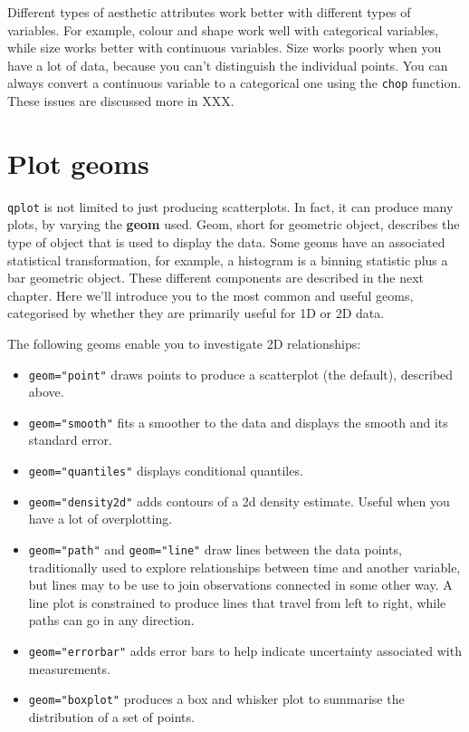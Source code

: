 Different types of aesthetic attributes work better with different types of variables.  For example, colour and shape work well with categorical variables, while size works better with continuous variables.  Size works poorly when you have a lot of data, because you can't distinguish the individual points.  You can always convert a continuous variable to a categorical one using the {\tt chop} function.  These issues are discussed more in XXX.

\section{Plot geoms}\label{sec:plot_geoms}

{\tt qplot} is not limited to just producing scatterplots.  In fact, it can produce many plots, by varying the {\bf geom} used. Geom, short for geometric object, describes the type of object that is used to display the data.  Some geoms have an associated statistical transformation, for example, a histogram is a binning statistic plus a bar geometric object.  These different components are described in the next chapter.  Here we'll introduce you to the most common and useful geoms, categorised by whether they are primarily useful for 1D or 2D data.

The following geoms enable you to investigate 2D relationships:

\begin{itemize}
	\item {\tt geom="point"} draws points to produce a scatterplot (the default), described above.
	\item {\tt geom="smooth"} fits a smoother to the data and displays the smooth and its standard error.
	\item {\tt geom="quantiles"} displays conditional quantiles.
	\item {\tt geom="density2d"} adds contours of a 2d density estimate.  Useful when you have a lot of overplotting.
	\item {\tt geom="path"} and {\tt geom="line"} draw lines between the data points, traditionally used to explore relationships between time and another variable, but lines may to be use to join observations connected in some other way.  A line plot is constrained to produce lines that travel from left to right, while paths can go in any direction.
	\item {\tt geom="errorbar"} adds error bars to help indicate uncertainty associated with measurements.
	\item {\tt geom="boxplot"} produces a box and whisker plot to summarise the distribution of a set of points.
\end{itemize}

